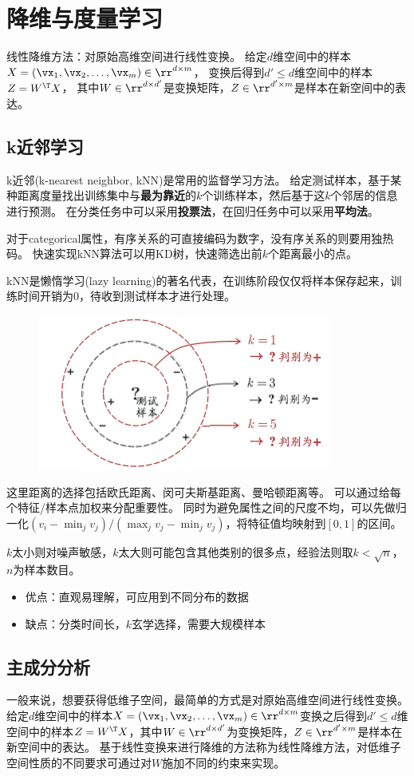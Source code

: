 
\section{降维与度量学习}
线性降维方法：对原始高维空间进行线性变换。
给定$d$维空间中的样本$X=(\vx_1,\vx_2,\ldots,\vx_m)\in\rr^{d\times m}$，
变换后得到$d'\leq d$维空间中的样本$Z=W^\T X$，
其中$W\in\rr^{d\times d'}$是变换矩阵，$Z\in\rr^{d'\times m}$是样本在新空间中的表达。

\subsection{k近邻学习}
k近邻(k-nearest neighbor, kNN)是常用的监督学习方法。
给定测试样本，基于某种距离度量找出训练集中与\textbf{最为靠近}的$k$个训练样本，然后基于这$k$个邻居的信息进行预测。
在分类任务中可以采用\textbf{投票法}，在回归任务中可以采用\textbf{平均法}。

对于categorical属性，有序关系的可直接编码为数字，没有序关系的则要用独热码。
快速实现kNN算法可以用KD树，快速筛选出前$k$个距离最小的点。

kNN是懒惰学习(lazy learning)的著名代表，在训练阶段仅仅将样本保存起来，训练时间开销为0，待收到测试样本才进行处理。
\begin{figure}[H]
\centering
\includegraphics[width=0.4\linewidth]{fig/kNN.png}
\end{figure}

这里距离的选择包括欧氏距离、闵可夫斯基距离、曼哈顿距离等。
可以通过给每个特征/样本点加权来分配重要性。
同时为避免属性之间的尺度不均，可以先做归一化$(v_i-\min_j v_j)/(\max_j v_j-\min_j v_j)$，将特征值均映射到$[0,1]$的区间。

$k$太小则对噪声敏感，$k$太大则可能包含其他类别的很多点，经验法则取$k<\sqrt{n}$，$n$为样本数目。

\begin{itemize}
	\item 优点：直观易理解，可应用到不同分布的数据
	\item 缺点：分类时间长，$k$玄学选择，需要大规模样本
\end{itemize}

\subsection{主成分分析}
一般来说，想要获得低维子空间，最简单的方式是对原始高维空间进行线性变换。
给定$d$维空间中的样本$X=(\vx_1,\vx_2,\ldots,\vx_m)\in\rr^{d\times m}$变换之后得到$d'\leq d$维空间中的样本$Z=W^\T X$，其中$W\in\rr^{d\times d'}$为变换矩阵，$Z\in\rr^{d'\times m}$是样本在新空间中的表达。
基于线性变换来进行降维的方法称为线性降维方法，对低维子空间性质的不同要求可通过对$W$施加不同的约束来实现。

